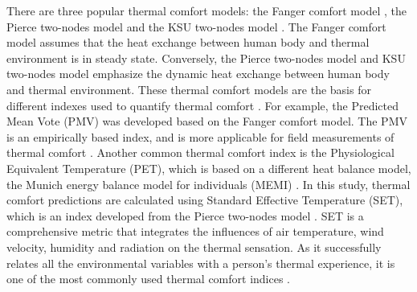 \documentclass[preprint,3p,12pt,english]{elsarticle}
\begin{document}
There are three popular thermal comfort models: the Fanger comfort model \cite{fanger1967calculation, fanger1972thermal}, the Pierce two-nodes model \cite{gagge1971effective} and the KSU two-nodes model \cite{azer1977}. The Fanger comfort model assumes that the heat exchange between human body and thermal environment is in steady state. Conversely, the Pierce two-nodes model and KSU two-nodes model emphasize the dynamic heat exchange between human body and thermal environment. These thermal comfort models are the basis for different indexes used to quantify thermal comfort \cite{epstein2006thermal,honjo2009thermal}. For example, the Predicted Mean Vote (PMV) was developed based on the Fanger comfort model. The PMV is an empirically based index, and is more applicable for field measurements of thermal comfort \cite{ye2003new}.  Another common thermal comfort index is the Physiological Equivalent Temperature (PET), which is based on a different heat balance model, the Munich energy balance model for individuals (MEMI) \cite{honjo2009thermal}. In this study, thermal comfort predictions are calculated using Standard Effective Temperature (SET), which is an index developed from the Pierce two-nodes model \cite{oohori1984comparison}.  SET is a comprehensive metric that integrates the influences of air temperature, wind velocity, humidity and radiation on the thermal sensation. As it successfully relates all the environmental variables with a person’s thermal experience, it is one of the most commonly used thermal comfort indices \cite{ye2003new}. 
\end{document}
